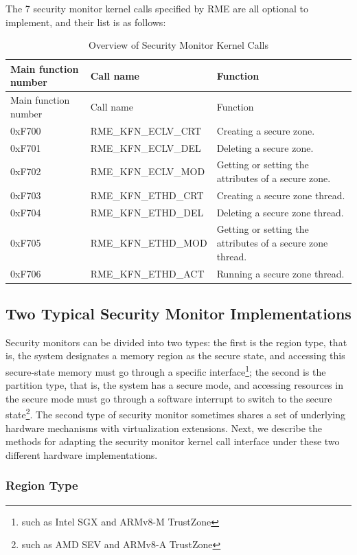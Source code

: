 The 7 security monitor kernel calls specified by RME are all optional to implement, and their list is as follows:

\begin{xltabular}{\textwidth}{@{}>{\hsize\raggedright\arraybackslash}X>{\hsize\raggedright\arraybackslash}X>{\hsize\raggedright\arraybackslash}X@{}}
\caption{Overview of Security Monitor Kernel Calls}\label{tab:8-93-security-monitor-kernel-calls}\\
\toprule
Main function number & Call name & Function\tabularnewline
\endfirsthead
\toprule
Main function number & Call name & Function\tabularnewline
\midrule
\endhead
\bottomrule
\endlastfoot
0xF700 & RME\_KFN\_ECLV\_CRT & Creating a secure zone.\tabularnewline
0xF701 & RME\_KFN\_ECLV\_DEL & Deleting a secure zone.\tabularnewline
0xF702 & RME\_KFN\_ECLV\_MOD & Getting or setting the attributes of a secure zone.\tabularnewline
0xF703 & RME\_KFN\_ETHD\_CRT & Creating a secure zone thread.\tabularnewline
0xF704 & RME\_KFN\_ETHD\_DEL & Deleting a secure zone thread.\tabularnewline
0xF705 & RME\_KFN\_ETHD\_MOD &
Getting or setting the attributes of a secure zone thread.\tabularnewline
0xF706 & RME\_KFN\_ETHD\_ACT & Running a secure zone thread.\tabularnewline
\end{xltabular}
\nopagebreak[4]

\subsection{Two Typical Security Monitor Implementations}\label{subsec:8-two-typical-security-monitor-implementations}

Security monitors can be divided into two types: the first is the region type, that is, the system designates a memory region as the secure state, and accessing this secure-state memory must go through a specific interface\footnote{such as Intel SGX and ARMv8-M TrustZone}; the second is the partition type, that is, the system has a secure mode, and accessing resources in the secure mode must go through a software interrupt to switch to the secure state\footnote{such as AMD SEV and ARMv8-A TrustZone}. The second type of security monitor sometimes shares a set of underlying hardware mechanisms with virtualization extensions. Next, we describe the methods for adapting the security monitor kernel call interface under these two different hardware implementations.

\subsubsection{Region Type}\label{subsubsec:8-region-type}

